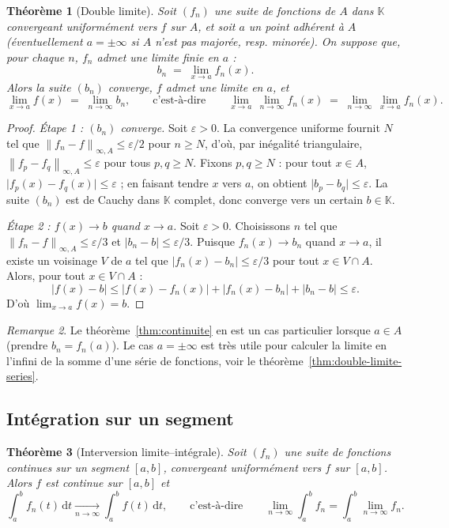 \documentclass[11pt,a4paper]{article}
\theoremstyle{plain}
\newtheorem{theoreme}{Théorème}[section]
\theoremstyle{definition}
\theoremstyle{remark}
\newtheorem{remarque}[theoreme]{Remarque}
\newcommand{\K}{\mathbb{K}}
\newcommand{\eps}{\varepsilon}
\newcommand{\Ninf}[2]{\left\lVert #1 \right\rVert_{\infty,#2}}
\newcommand{\dd}{\,\mathrm{d}}
\numberwithin{equation}{section}
\begin{document}
\begin{theoreme}[Double limite]\label{thm:double-limite}
Soit $(f_n)$ une suite de fonctions de $A$ dans $\K$ convergeant
uniformément vers $f$ sur $A$, et soit $a$ un point adhérent à $A$
(éventuellement $a=\pm\infty$ si $A$ n'est pas majorée, resp. minorée).
On suppose que, pour chaque $n$, $f_n$ admet une limite finie en $a$ :
\[
    b_n \;=\; \lim_{x\to a} f_n(x) .
\]
Alors la suite $(b_n)$ converge, $f$ admet une limite en $a$, et
\[
    \lim_{x\to a} f(x) \;=\; \lim_{n\to\infty} b_n,
    \qquad\text{c'est-à-dire}\qquad
    \lim_{x\to a}\,\lim_{n\to\infty} f_n(x)
    \;=\; \lim_{n\to\infty}\,\lim_{x\to a} f_n(x) .
\]
\end{theoreme}

\begin{proof}
\emph{Étape 1 : $(b_n)$ converge.} Soit $\eps>0$. La convergence uniforme
fournit $N$ tel que $\Ninf{f_n-f}{A}\leq\eps/2$ pour $n\geq N$, d'où, par
inégalité triangulaire, $\Ninf{f_p-f_q}{A}\leq\eps$ pour tous $p,q\geq N$.
Fixons $p,q\geq N$ : pour tout $x\in A$,
$\lvert f_p(x)-f_q(x)\rvert\leq\eps$ ; en faisant tendre $x$ vers $a$, on
obtient $\lvert b_p-b_q\rvert\leq\eps$. La suite $(b_n)$ est de Cauchy dans
$\K$ complet, donc converge vers un certain $b\in\K$.

\emph{Étape 2 : $f(x)\to b$ quand $x\to a$.} Soit $\eps>0$. Choisissons $n$
tel que $\Ninf{f_n-f}{A}\leq\eps/3$ et $\lvert b_n-b\rvert\leq\eps/3$.
Puisque $f_n(x)\to b_n$ quand $x\to a$, il existe un voisinage $V$ de $a$
tel que $\lvert f_n(x)-b_n\rvert\leq\eps/3$ pour tout $x\in V\cap A$.
Alors, pour tout $x\in V\cap A$ :
\[
    \lvert f(x)-b\rvert
    \leq \lvert f(x)-f_n(x)\rvert + \lvert f_n(x)-b_n\rvert
       + \lvert b_n-b\rvert \leq \eps .
\]
D'où $\lim_{x\to a}f(x)=b$.
\end{proof}

\begin{remarque}
Le théorème~\ref{thm:continuite} en est un cas particulier lorsque
$a\in A$ (prendre $b_n=f_n(a)$). Le cas $a=\pm\infty$ est très utile pour
calculer la limite en l'infini de la somme d'une série de fonctions, voir
le théorème~\ref{thm:double-limite-series}.
\end{remarque}

\subsection{Intégration sur un segment}

\begin{theoreme}[Interversion limite--intégrale]\label{thm:integration}
Soit $(f_n)$ une suite de fonctions \emph{continues} sur un segment
$[a,b]$, convergeant uniformément vers $f$ sur $[a,b]$. Alors $f$ est
continue sur $[a,b]$ et
\[
    \int_a^b f_n(t)\dd t \xrightarrow[n\to\infty]{} \int_a^b f(t)\dd t,
    \qquad\text{c'est-à-dire}\qquad
    \lim_{n\to\infty}\int_a^b f_n = \int_a^b \lim_{n\to\infty} f_n .
\]
\end{theoreme}
\end{document}
